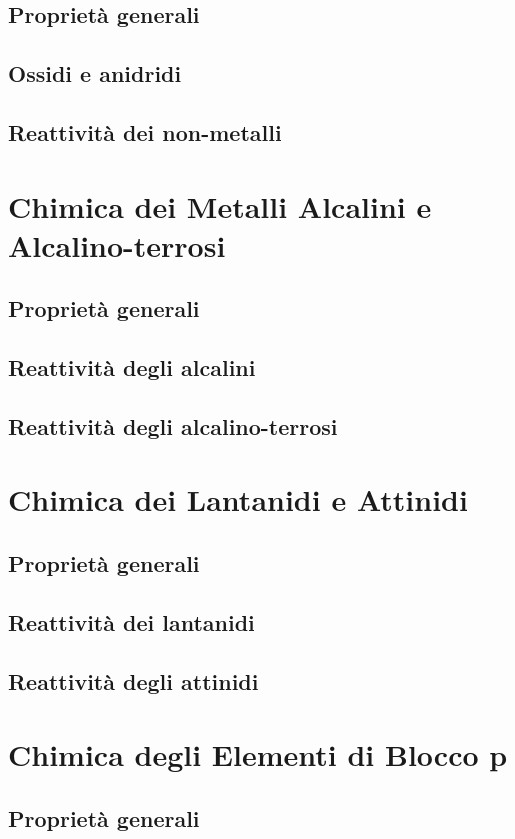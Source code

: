 \subsection{Proprietà generali}
\subsection{Ossidi e anidridi}
\subsection{Reattività dei non-metalli}

\section{Chimica dei Metalli Alcalini e Alcalino-terrosi}
\subsection{Proprietà generali}
\subsection{Reattività degli alcalini}
\subsection{Reattività degli alcalino-terrosi}

\section{Chimica dei Lantanidi e Attinidi}
\subsection{Proprietà generali}
\subsection{Reattività dei lantanidi}
\subsection{Reattività degli attinidi}

\section{Chimica degli Elementi di Blocco p}
\subsection{Proprietà generali}
